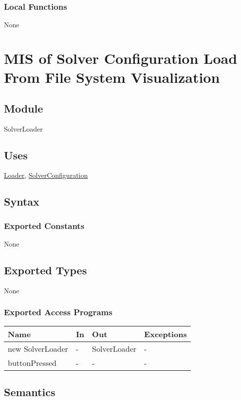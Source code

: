 \documentclass[12pt, titlepage]{article}
\begin{document}
\subsubsection{Local Functions}
None
\newpage
\section{MIS of Solver Configuration Load From File System Visualization} \label{SolverLoader}

\subsection{Module}

SolverLoader

\subsection{Uses}
\hyperref[Loader]{Loader}, \hyperref[SolverConfiguration]{SolverConfiguration}

\subsection{Syntax}

\subsubsection{Exported Constants}
None
\subsection{Exported Types}
None

\subsubsection{Exported Access Programs}
\begin{center}
\begin{tabular}{p{5cm} p{2cm} p{4cm} p{5.5cm}}
\hline
\textbf{Name} & \textbf{In} & \textbf{Out} & \textbf{Exceptions} \\
\hline
new SolverLoader & - & SolverLoader & - \\
\hline
buttonPressed & - & - & - \\
\hline
\end{tabular}
\end{center}

\subsection{Semantics}
\end{document}
